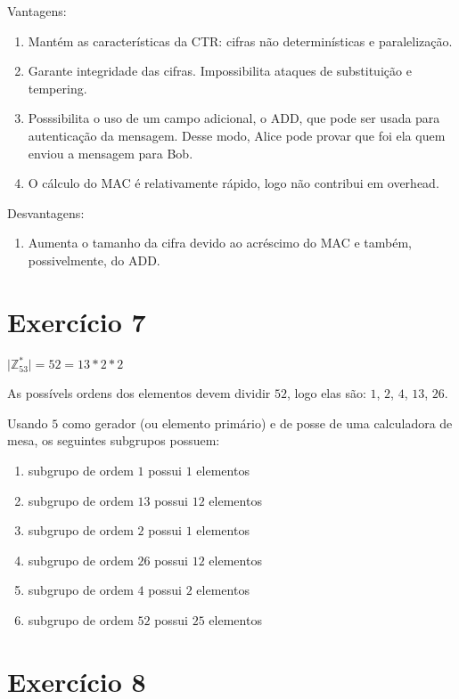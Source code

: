 \documentclass[a4paper]{article}
\begin{document}
Vantagens:

\begin{enumerate}
\item Mantém as características da CTR: cifras não determinísticas e paralelização.
\item Garante integridade das cifras. Impossibilita ataques de substituição e tempering.
\item Posssibilita o uso de um campo adicional, o ADD, que pode ser usada para autenticação da mensagem. Desse modo, Alice pode provar
que foi ela quem enviou a mensagem para Bob.
\item O cálculo do MAC é relativamente rápido, logo não contribui em overhead.
\end{enumerate}

Desvantagens:

\begin{enumerate}
\item Aumenta o tamanho da cifra devido ao acréscimo do MAC e também, possivelmente, do ADD.
\end{enumerate}

\section{Exercício 7}\label{sec:Ex7}
$\vert\mathbb{Z}_{53}^{*}\vert = 52 = 13 * 2 * 2$

As possívels ordens dos elementos devem dividir $52$, logo elas são: $1$, $2$, $4$, $13$, $26$.

Usando $5$ como gerador (ou elemento primário) e de posse de uma calculadora
de mesa, os seguintes subgrupos possuem:

\begin{enumerate}
\item subgrupo de ordem $1$ possui $1$ elementos
\item subgrupo de ordem $13$ possui $12$ elementos
\item subgrupo de ordem $2$ possui $1$ elementos
\item subgrupo de ordem $26$ possui $12$ elementos
\item subgrupo de ordem $4$ possui $2$ elementos
\item subgrupo de ordem $52$ possui $25$ elementos
\end{enumerate}

\section{Exercício 8}\label{sec:Ex8}
\end{document}
